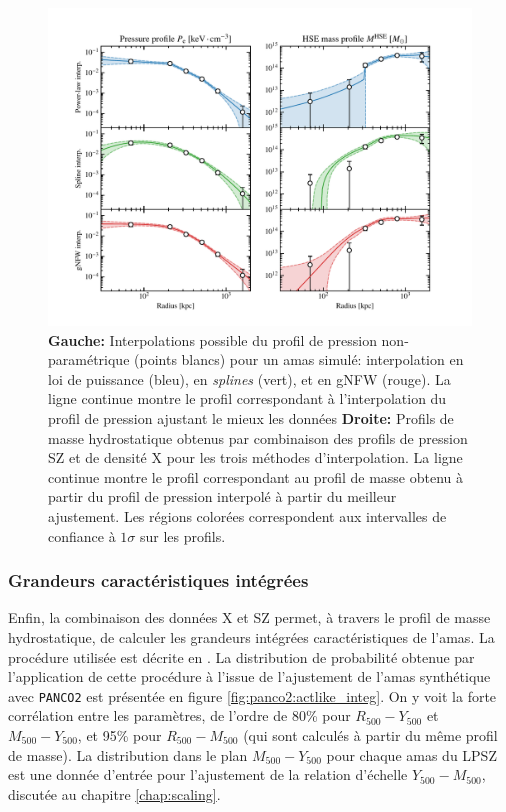 \begin{figure}[t]
    \centering
    \includegraphics[width=.95\linewidth]{Figures/Chap_panco/demo_plots/interps.pdf}
    \caption{
        \textbf{Gauche:} Interpolations possible du profil de pression non-paramétrique (points blancs) pour un amas simulé: interpolation en loi de puissance (bleu), en \textit{splines} (vert), et en gNFW (rouge).
        La ligne continue montre le profil correspondant à l'interpolation du profil de pression ajustant le mieux les données
        \textbf{Droite:} Profils de masse hydrostatique obtenus par combinaison des profils de pression SZ et de densité X pour les trois méthodes d'interpolation.
        La ligne continue montre le profil correspondant au profil de masse obtenu à partir du profil de pression interpolé à partir du meilleur ajustement.
        Les régions colorées correspondent aux intervalles de confiance à $1\sigma$ sur les profils.
    }
    \label{fig:panco:interp_np}
\end{figure}

\subsubsection{Grandeurs caractéristiques intégrées} %
Enfin, la combinaison des données X et SZ permet, à travers le profil de masse hydrostatique, de calculer les grandeurs intégrées caractéristiques de l'amas.
La procédure utilisée est décrite en .
La distribution de probabilité obtenue par l'application de cette procédure à l'issue de l'ajustement de l'amas synthétique avec \texttt{PANCO2} est présentée en figure \ref{fig:panco2:actlike_integ}.
On y voit la forte corrélation entre les paramètres, de l'ordre de 80\% pour $R_{500}-Y_{500}$ et $M_{500}-Y_{500}$, et 95\% pour $R_{500}-M_{500}$ (qui sont calculés à partir du même profil de masse).
La distribution dans le plan $M_{500}-Y_{500}$ pour chaque amas du LPSZ est une donnée d'entrée pour l'ajustement de la relation d'échelle $Y_{500}-M_{500}$, discutée au chapitre \ref{chap:scaling}.

